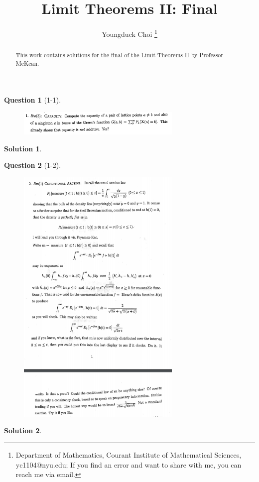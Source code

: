\documentclass[11pt]{article}
\date{}
\title{\vspace{-0.7cm}
Limit Theorems II: Final}
\author{
Youngduck Choi 
\thanks{Department of Mathematics, Courant Institute of Mathematical Sciences, 
yc1104@nyu.edu; If you find an error and want to share with me, 
you can reach me via email.
}}
\theoremstyle{plain}
\theoremstyle{quest}
\newtheorem*{question}{Question}
\newtheorem*{solution}{Solution}
\begin{document}
\maketitle

\begin{abstract}
This work contains solutions for the final of the Limit Theorems II by Professor
McKean.
\end{abstract}


\begin{question}[1-1]
\hfill
\begin{figure}[h!]
  \centering
    \includegraphics[width=0.7\textwidth]{limthm2-f-p1.png}
\end{figure}
\end{question}
\begin{solution} \hfill \\
\end{solution}

\newpage

\begin{question}[1-2]
\hfill
\begin{figure}[h!]
  \centering
    \includegraphics[width=0.7\textwidth]{limthm2-f-p2.png}
\end{figure}
\end{question}
\begin{solution} \hfill \\
\end{solution}
\end{document}
